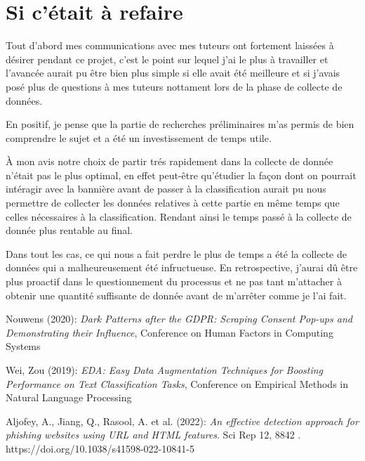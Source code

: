 \documentclass[oneside,a4paper,12pt]{article}
\begin{document}
	\section{Si c'était à refaire}
	
	Tout d'abord mes communications avec mes tuteurs ont fortement laissées à désirer pendant ce projet, c'est le point sur lequel j'ai le plus à travailler et l'avancée aurait pu être bien plus simple si elle avait été meilleure et si j'avais posé plus de questions à mes tuteurs nottament lors de la phase de collecte de données.
	
	En positif, je pense que la partie de recherches préliminaires m'as permis de bien comprendre le sujet et a été un investissement de temps utile.
	
	\`A mon avis notre choix de partir trés rapidement dans la collecte de donnée n'était pas le plus optimal, en effet peut-être qu'étudier la façon dont on pourrait intéragir avec la bannière avant de passer à la classification aurait pu nous permettre de collecter les données relatives à cette partie en même temps que celles nécessaires à la classification. Rendant ainsi le temps passé à la collecte de donnée plus rentable au final.
	
	Dans tout les cas, ce qui nous a fait perdre le plus de temps a été la collecte de données qui a malheureusement été infructueuse. En retrospective, j'aurai dû être plus proactif dans le questionnement du processus et ne pas tant m'attacher à obtenir une quantité suffisante de donnée avant de m'arrêter comme je l'ai fait.
	
	\newpage
	
	\begin{thebibliography}{9}
		 Nouwens (2020): \emph{Dark Patterns after the GDPR: Scraping
Consent Pop-ups and Demonstrating their Influence}, Conference on Human Factors in Computing Systems
		
		 Wei, Zou (2019): \emph{{EDA}: Easy Data Augmentation Techniques for Boosting Performance on Text Classification Tasks}, Conference on Empirical Methods in Natural Language Processing
		
		 Aljofey, A., Jiang, Q., Rasool, A. et al. (2022): \emph{An effective detection approach for phishing websites using URL and HTML features}. Sci Rep 12, 8842 . https://doi.org/10.1038/s41598-022-10841-5 
	\end{thebibliography}
\end{document}
